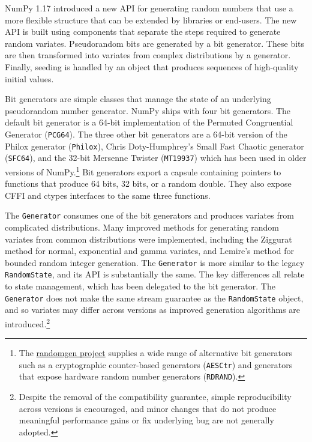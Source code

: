 \documentclass[fleqn,10pt]{wlscirep}
\newcommand{\code}[1]{\texttt{#1}}
\begin{document}
NumPy 1.17 introduced a new API for generating random numbers that use a more
flexible structure that can be extended by libraries or end-users. The new API
is built using components that separate the steps required to generate random
variates. Pseudorandom bits are generated by a bit generator. These bits are
then transformed into variates from complex distributions by a generator.
Finally, seeding is handled by an object that produces sequences of high-quality
initial values.

Bit generators are simple classes that manage the state of an underlying
pseudorandom number generator. NumPy ships with four bit generators. The default
bit generator is a 64-bit implementation of the Permuted Congruential Generator
\cite{pcg64} (\code{PCG64}). The three other bit generators are a 64-bit version
of the Philox generator\cite{random123} (\code{Philox}), Chris Doty-Humphrey's
Small Fast Chaotic generator\cite{practrand} (\code{SFC64}), and the 32-bit
Mersenne Twister\cite{mt19937} (\code{MT19937}) which has been used in older
versions of NumPy.\footnote{The
\href{https://github.com/bashtage/randomgen}{randomgen project} supplies a wide
range of alternative bit generators such as a cryptographic counter-based
generators (\code{AESCtr}) and generators that expose hardware random number
generators (\code{RDRAND})\cite{randomgen}.} Bit generators export a capsule
containing pointers to functions that produce 64 bits, 32 bits, or a random
double. They also expose CFFI and ctypes interfaces to the same three functions.

The \code{Generator} consumes one of the bit generators and produces variates
from complicated distributions. Many improved methods for generating random
variates from common distributions were implemented, including the Ziggurat
method for normal, exponential and gamma variates\cite{ziggurat}, and Lemire's
method for bounded random integer generation\cite{lemire}. The \code{Generator}
is more similar to the legacy \code{RandomState}, and its API is substantially
the same. The key differences all relate to state management, which has been
delegated to the bit generator. The \code{Generator} does not make the same
stream guarantee as the \code{RandomState} object, and so variates may differ
across versions as improved generation algorithms are
introduced.\footnote{Despite the removal of the compatibility guarantee, simple
reproducibility across versions is encouraged, and minor changes that do not
produce meaningful performance gains or fix underlying bug are not generally
adopted.}
\end{document}
